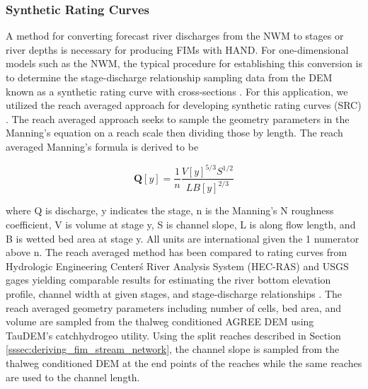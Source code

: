 \subsubsection{Synthetic Rating Curves}
\label{sssec:synthetic_rating_curve}
%
 A method for converting forecast river discharges from the NWM to stages or river depths is necessary for producing FIMs with HAND. 
For one-dimensional models such as the NWM, the typical procedure for establishing this conversion is to determine the stage-discharge relationship sampling data from the DEM known as a synthetic rating curve with cross-sections \cite{quintero2021development,di2011hydraulic}. 
For this application, we utilized the reach averaged approach for developing synthetic rating curves (SRC) \cite{zheng2018river}.
The reach averaged approach seeks to sample the geometry parameters in the Manning's equation \cite{gauckler1867etudes,manning1890flow} on a reach scale then dividing those by length. 
The reach averaged Manning's formula is derived to be 
%
\begin{linenomath*}
\begin{equation}
\label{eq:reach_averaged_mannings_equation}
\textbf{Q}[y] = \frac{1}{n} \frac{V[y]^{5/3}S^{1/2}}{L B[y]^{2/3}} 
\end{equation}
\end{linenomath*}
%
where Q is discharge, y indicates the stage, n is the Manning's N roughness coefficient, V is volume at stage y, S is channel slope, L is along flow length, and B is wetted bed area at stage y.
All units are international given the 1 numerator above n.
The reach averaged method has been compared to rating curves from Hydrologic Engineering Center\'s River Analysis System (HEC-RAS) and USGS gages yielding comparable results for estimating the river bottom elevation profile, channel width at given stages, and stage-discharge relationships \cite{zheng2018river}.
The reach averaged geometry parameters including number of cells, bed area, and volume are sampled from the thalweg conditioned AGREE DEM using TauDEM's catchhydrogeo utility.
Using the split reaches described in Section \ref{sssec:deriving_fim_stream_network}, the channel slope is sampled from the thalweg conditioned DEM at the end points of the reaches while the same reaches are used to the channel length.


